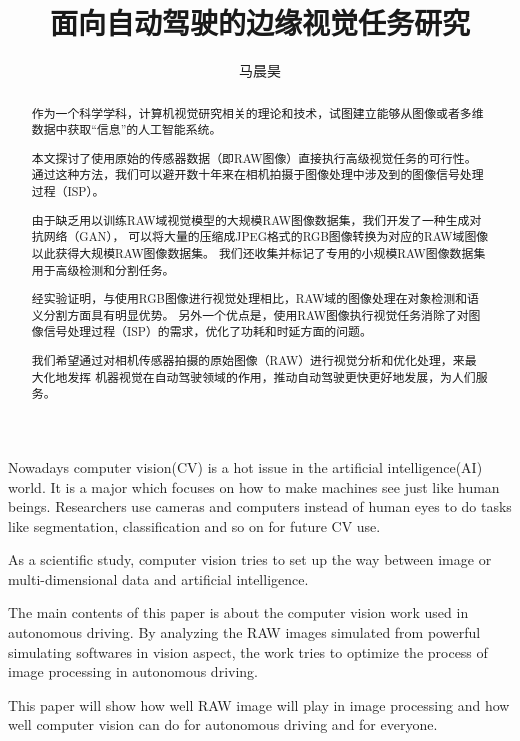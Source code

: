 \documentclass[winfonts]{njuthesis}
\title{面向自动驾驶的边缘视觉任务研究}
\author{马晨昊}
\begin{document}
\maketitle

\begin{abstract}
  
  作为一个科学学科，计算机视觉研究相关的理论和技术，试图建立能够从图像或者多维数据中获取“信息”的人工智能系统。
  
  本文探讨了使用原始的传感器数据（即RAW图像）直接执行高级视觉任务的可行性。
  通过这种方法，我们可以避开数十年来在相机拍摄于图像处理中涉及到的图像信号处理过程（ISP）。
  
  由于缺乏用以训练RAW域视觉模型的大规模RAW图像数据集，我们开发了一种生成对抗网络（GAN），
  可以将大量的压缩成JPEG格式的RGB图像转换为对应的RAW域图像以此获得大规模RAW图像数据集。
  我们还收集并标记了专用的小规模RAW图像数据集用于高级检测和分割任务。
  
  经实验证明，与使用RGB图像进行视觉处理相比，RAW域的图像处理在对象检测和语义分割方面具有明显优势。
  另外一个优点是，使用RAW图像执行视觉任务消除了对图像信号处理过程（ISP）的需求，优化了功耗和时延方面的问题。
  
  我们希望通过对相机传感器拍摄的原始图像（RAW）进行视觉分析和优化处理，来最大化地发挥
  机器视觉在自动驾驶领域的作用，推动自动驾驶更快更好地发展，为人们服务。

\end{abstract}

\begin{englishabstract}
Nowadays computer vision(CV) is a hot issue in the artificial intelligence(AI) world. 
It is a major which focuses on how to make machines see just like human beings. 
Researchers use cameras and computers instead of human eyes to do tasks like segmentation, classification and so on for future CV use.

As a scientific study, computer vision tries to set up the way between image or multi-dimensional data and artificial intelligence.

The main contents of this paper is about the computer vision work used in autonomous driving. 
By analyzing the RAW images simulated from powerful simulating softwares in vision aspect, the work tries to optimize the process of image processing in autonomous driving.

This paper will show how well RAW image will play in image processing and how well computer vision can do for autonomous driving and for everyone.



\end{englishabstract}
\end{document}
